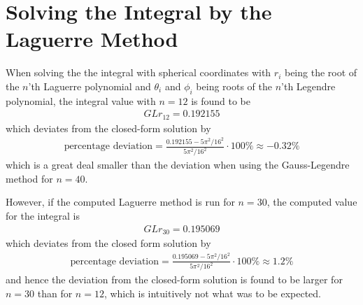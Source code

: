 \section{Solving the Integral by the Laguerre Method}
\label{sec:ResultsLaguerreMethod}
When solving the the integral with spherical coordinates with $r_i$ being the root of the $n$'th Laguerre polynomial and $\theta_i$ and $\phi_i$ being roots of the $n$'th Legendre polynomial, the integral value with $n = 12$ is found to be 
\begin{align}
	GLr_{12} = 0.192155
\end{align}
which deviates from the closed-form solution by
\begin{align}
	\text{percentage deviation} = \frac{0.192155 - 5\pi^2 /16^2}{5\pi^2 /16^2} \cdot 100 \% \approx -0.32 \%
\end{align}
which is a great deal smaller than the deviation when using the Gauss-Legendre method for $n=40$.

However, if the computed Laguerre method is run for $n=30$, the computed value for the integral is 
\begin{align}
	GLr_{30} = 0.195069
\end{align}
which deviates from the closed form solution by
\begin{align}
	\text{percentage deviation} = \frac{0.195069 - 5\pi^2 /16^2}{5\pi^2 /16^2} \cdot 100 \% \approx 1.2 \%
\end{align}
and hence the deviation from the closed-form solution is found to be larger for $n=30$ than for $n=12$, which is intuitively not what was to be expected.
